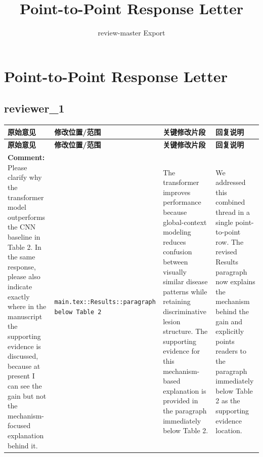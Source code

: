 \documentclass[11pt]{article}
\title{Point-to-Point Response Letter}
\author{review-master Export}
\date{}
\begin{document}
\maketitle

\section*{Point-to-Point Response Letter}

\subsection*{ reviewer_1 }
\begin{longtable}{|p{}|p{}|p{}|p{}|}
\hline
\textbf{原始意见} & \textbf{修改位置/范围} & \textbf{关键修改片段} & \textbf{回复说明} \\
\hline
\endfirsthead
\hline
\textbf{原始意见} & \textbf{修改位置/范围} & \textbf{关键修改片段} & \textbf{回复说明} \\
\hline
\endhead
\textbf{Comment:} Please clarify why the transformer model outperforms the CNN baseline in Table 2. In the same response, please also indicate exactly where in the manuscript the supporting evidence is discussed, because at present I can see the gain but not the mechanism-focused explanation behind it. & \texttt{ main.tex::Results::paragraph below Table 2 } & {\color{blue}\ttfamily The transformer improves performance because global-context modeling reduces confusion between visually similar disease patterns while retaining discriminative lesion structure. The supporting evidence for this mechanism-based explanation is provided in the paragraph immediately below Table 2.} & We addressed this combined thread in a single point-to-point row. The revised Results paragraph now explains the mechanism behind the gain and explicitly points readers to the paragraph immediately below Table 2 as the supporting evidence location. \\
\hline
\end{longtable}
\end{document}
